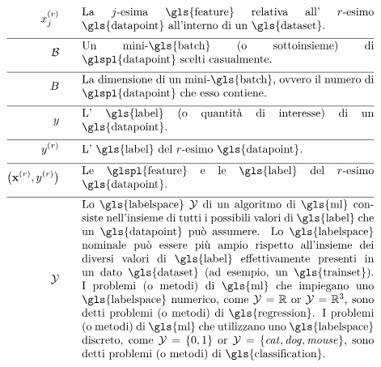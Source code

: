 \begin{align}
	\feature_{\featureidx}^{(\sampleidx)}\quad\quad &\parbox{.75\textwidth}{La $\featureidx$-esima \gls{feature} relativa all' $\sampleidx$-esimo 
		\gls{datapoint} all'interno di un \gls{dataset}.} \nonumber \\[2mm] \hline \nonumber\\[-5mm]
	\batch \quad\quad &\parbox{.75\textwidth}{Un mini-\gls{batch} (o sottoinsieme) di \glspl{datapoint} scelti casualmente.}\nonumber \\[2mm] \hline \nonumber\\[-5mm]
	\batchsize \quad\quad &\parbox{.75\textwidth}{La dimensione di un mini-\gls{batch}, ovvero il numero di \glspl{datapoint} che esso contiene.}\nonumber \\[2mm] \hline \nonumber\\[-5mm]
	\truelabel \quad\quad &\parbox{.75\textwidth}{L' \gls{label} (o quantità di interesse) di un \gls{datapoint}.} \nonumber \\[2mm] \hline \nonumber\\[-5mm]
	\truelabel^{(\sampleidx)} \quad\quad &\parbox{.75\textwidth}{L' \gls{label} del $\sampleidx$-esimo \gls{datapoint}.} \nonumber \\[2mm] \hline \nonumber\\[-5mm]
	\big(\featurevec^{(\sampleidx)},\truelabel^{(\sampleidx)}\big)  \quad\quad &\parbox{.75\textwidth}{Le \glspl{feature} e le \gls{label} del $\sampleidx$-esimo \gls{datapoint}.}\nonumber \\[2mm] \hline \nonumber\\[-5mm]
	\labelspace  \quad\quad & \parbox{.75\textwidth}{Lo \gls{labelspace} $\labelspace$ di un algoritmo di \gls{ml} consiste nell’insieme di tutti i possibili valori di \gls{label} che un \gls{datapoint} può assumere. Lo \gls{labelspace} nominale può essere più ampio rispetto all’insieme dei diversi valori di \gls{label} effettivamente presenti in un dato \gls{dataset} (ad esempio, un \gls{trainset}). I problemi (o metodi) di \gls{ml} che impiegano uno \gls{labelspace} numerico, come $\labelspace=\mathbb{R}$ 
		or $\labelspace=\mathbb{R}^{3}$, sono detti problemi (o metodi) di \gls{regression}. I problemi (o metodi) di \gls{ml} che utilizzano uno \gls{labelspace} discreto, come $\labelspace=\{0,1\}$ or $\labelspace=\{\mbox{\emph{cat}},\mbox{\emph{dog}},\mbox{\emph{mouse}}\}$, 
		sono detti problemi (o metodi) di \gls{classification}.}  \nonumber %
\end{align}                  


